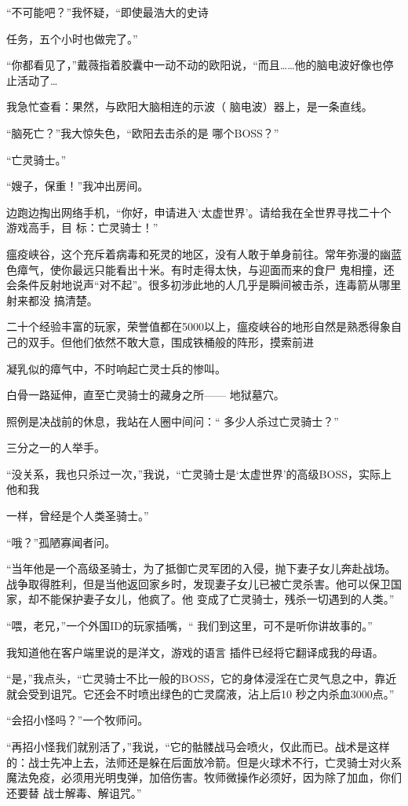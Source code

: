\documentclass{article}
\begin{document}
“不可能吧？”我怀疑，“即使最浩大的史诗

\newpage
任务，五个小时也做完了。” 

“你都看见了，”戴薇指着胶囊中一动不动的欧阳说，“而且……他的脑电波好像也停止活动了…

我急忙查看：果然，与欧阳大脑相连的示波（
脑电波）器上，是一条直线。 

“脑死亡？”我大惊失色，“欧阳去击杀的是
哪个BOSS？” 


“亡灵骑士。” 


“嫂子，保重！”我冲出房间。 

边跑边掏出网络手机，“你好，申请进入‘太虚世界’。请给我在全世界寻找二十个游戏高手，目
标：亡灵骑士！” 

瘟疫峡谷，这个充斥着病毒和死灵的地区，没有人敢于单身前往。常年弥漫的幽蓝色瘴气，使你最远只能看出十米。有时走得太快，与迎面而来的食尸
\newpage
鬼相撞，还会条件反射地说声“对不起”。很多初涉此地的人几乎是瞬间被击杀，连毒箭从哪里射来都没
搞清楚。 

二十个经验丰富的玩家，荣誉值都在5000以上，瘟疫峡谷的地形自然是熟悉得象自己的双手。但他们依然不敢大意，围成铁桶般的阵形，摸索前进

凝乳似的瘴气中，不时响起亡灵士兵的惨叫。
 

白骨一路延伸，直至亡灵骑士的藏身之所——
地狱墓穴。 

照例是决战前的休息，我站在人圈中间问：“
多少人杀过亡灵骑士？” 


三分之一的人举手。 

“没关系，我也只杀过一次，”我说，“亡灵骑士是‘太虚世界’的高级BOSS，实际上他和我
\newpage

一样，曾经是个人类圣骑士。” 


“哦？”孤陋寡闻者问。 

“当年他是一个高级圣骑士，为了抵御亡灵军团的入侵，抛下妻子女儿奔赴战场。战争取得胜利，但是当他返回家乡时，发现妻子女儿已被亡灵杀害。他可以保卫国家，却不能保护妻子女儿，他疯了。他
变成了亡灵骑士，残杀一切遇到的人类。” 

“喂，老兄，”一个外国ID的玩家插嘴，“
我们到这里，可不是听你讲故事的。” 

我知道他在客户端里说的是洋文，游戏的语言
插件已经将它翻译成我的母语。 

“是，”我点头，“亡灵骑士不比一般的BOSS，它的身体浸淫在亡灵气息之中，靠近就会受到诅咒。它还会不时喷出绿色的亡灵腐液，沾上后10
秒之内杀血3000点。” 

\newpage


“会招小怪吗？”一个牧师问。 

“再招小怪我们就别活了，”我说，“它的骷髅战马会喷火，仅此而已。战术是这样的：战士先冲上去，法师还是躲在后面放冷箭。但是火球术不行，亡灵骑士对火系魔法免疫，必须用光明曳弹，加倍伤害。牧师微操作必须好，因为除了加血，你们还要替
战士解毒、解诅咒。” 
\end{document}

